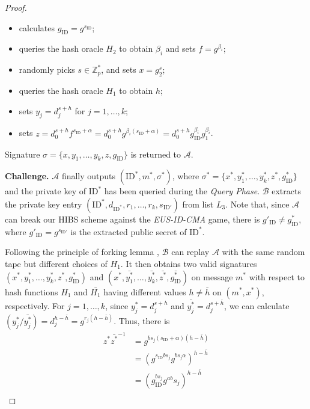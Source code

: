\documentclass[times]{secauth}
\theoremstyle{definition}
\theoremstyle{remark}
\begin{document}
\begin{proof}
\begin{itemize}
	\begin{itemize}
		\item calculates $g_\mathrm{ID} = g^{s_\mathrm{ID}}$;
		\item queries the hash oracle $H_2$ to obtain $\beta_i$ and sets $f = g^{\beta_i}$;
		\item randomly picks $s \in \mathbb{Z}_p^*$, and sets $x = g_2^s$;
		\item queries the hash oracle $H_1$ to obtain $h$;
		\item sets $y_j = d_j^{s+h}$ for $j = 1,\ldots, k$;
		\item sets $z= d_0^{s + h} f^{s_\mathrm{ID}+\alpha} = d_0^{s + h}g^{\beta_i(s_\mathrm{ID}+\alpha)} = d_0^{s + h}g_\mathrm{ID}^{\beta_i}g_1^{\beta_i}$.
	\end{itemize}
	Signature $\sigma = \{x, y_1, \ldots, y_k, z, g_{\mathrm{ID}}\}$ is returned to $\mathcal{A}$.
\end{itemize}
\textbf{Challenge.} 
$\mathcal{A}$ finally outputs $(\mathrm{ID}^*, m^*, \sigma^*)$, where $ \sigma^*=\{x^*, y^*_1, \ldots, y^*_k, z^*, g^*_\mathrm{ID}\}$ and the private key of $\mathrm{ID}^*$ has been queried during the \emph{Query Phase}. 
$\mathcal{B}$ extracts the private key entry $(\mathrm{ID}^*, d_{\mathrm{ID}^*}, r_1, \ldots, r_k, s_{\mathrm{ID}'})$ from list $L_3$. 
Note that, since $\mathcal{A}$ can break our HIBS scheme against the \emph{EUS-ID-CMA} game, there is $g'_\mathrm{ID} \neq g^*_\mathrm{ID}$, where $g'_\mathrm{ID} = g^{s_{\mathrm{ID}'}}$ is the extracted public secret of $\mathrm{ID}^*$.
\par
Following the principle of forking lemma \cite{Pointcheval1996security}, $\mathcal{B}$ can replay $\mathcal{A}$ with the same random tape but different choices of $H_1$.
It then obtains two valid signatures $(x^*, y_1^*, \ldots, y_k^*, z^*, g_\mathrm{ID}^*)$ and $(x^*, \bar{y^*_1}, \ldots, \bar{y^*_k}, \bar{z^*}, \bar{g^*_\mathrm{ID}})$ on message $m^*$ with respect to hash functions $H_1$ and $\bar{H_1}$ having different values $h \neq \bar{h}$ on $(m^*, x^*)$, respectively. 
For $j = 1, \ldots, k$, since $y^*_j = d_j^{s+h}$ and $\bar{y^*_j} = d_j^{s+\bar{h}}$, we can calculate $(y^*_j / \bar{y^*_j}) = d_j^{h-\bar{h}} = g^{r_j(h-\bar{h})}$. 
Thus, there is 
\begin{align*}
z^*\bar{z^*}^{-1} &= g^{bs_j(s_\mathrm{ID}+\alpha)(h-\bar{h})}\\
&= \left(g^{s_\mathrm{ID}bs_j}g^{bs_j\alpha}\right)^{h-\bar{h}}\\
&= \left(g_\mathrm{ID}^{bs_j}g^{ab}s_j\right)^{h-\bar{h}}\\

\end{align*}
\end{proof}
\end{document}
